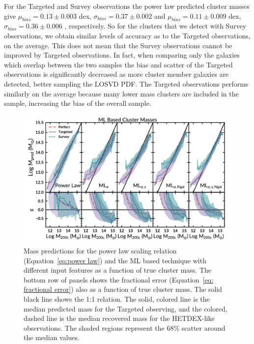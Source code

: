 \documentclass[fleqn,usenatbib]{mnras}
\newcommand{\editorial}[1]{\textcolor{red}{#1}}
\begin{document}

For the Targeted and Survey observations the power law predicted cluster masses give $\mu_{bias} =0.13\pm{0.003}$ dex, $\sigma_{bias} = 0.37\pm{0.002}$ and $\mu_{bias} =0.11\pm{0.009}$ dex, $\sigma_{bias} = 0.36\pm{0.006}$ , respectively. So for the clusters that we detect with Survey observations, we obtain similar levels of accuracy as to the Targeted observations, on the average. This does not mean that the Survey observations cannot be improved by Targeted observations. In fact, when comparing only the galaxies which overlap between the two samples the bias and scatter of the Targeted observations is significantly decreased as more cluster member galaxies are detected, better sampling the LOSVD PDF. The Targeted observations performs similarly on the average because many lower mass clusters are included in the sample, increasing the bias of the overall sample.

\begin{figure} 
	\includegraphics[width=\textwidth]{figures/MLcomparison.pdf} 
	\caption{Mass predictions for the power law scaling relation (Equation~\ref{eq:power law}) and the ML based technique with different input features as a function of true cluster mass. The bottom row of panels shows the fractional error (Equation~\ref{eq: fractional error}) also as a function of true cluster mass. The solid black line shows the 1:1 relation. The solid, colored line is the median predicted mass for the Targeted observing, and the colored, dashed line is the median recovered mass for the HETDEX-like observations. The shaded regions represent the 68\% scatter around the median values.} \label{fig: ML comparison} 
\end{figure}
\end{document}
